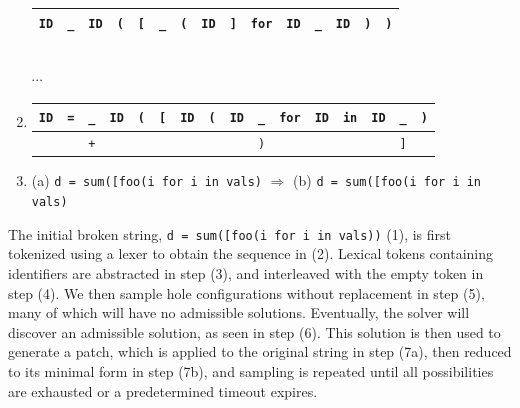 \documentclass[sigplan,review,anonymous,acmsmall]{acmart}\settopmatter{printfolios=false,printccs=false,printacmref=false}
\begin{document}
\begin{enumerate}
\begin{tabular}{|||c|||c|||c|||c|||c|||c|||c|||c|||c|||c|||c|||c|||c|||c|||c|||}
    \hline
    \texttt{ID} & \cellcolor{black!15}\texttt{\_} & \texttt{ID} & \texttt{(} & \texttt{[} & \cellcolor{black!15}\texttt{\_} & \texttt{(} & \texttt{ID} & \texttt{]} & \texttt{for} & \texttt{ID} & \cellcolor{black!15}\texttt{\_} & \texttt{ID} & \texttt{)} & \texttt{)} \\\hline
  \end{tabular}\\$\cdots$
  \item \begin{tabular}{|||c|||c||c|c|||c|||c|||c|||c|||c|||c|||c|||c|||c|||c|||c|||c|||}
          \hline
          \texttt{ID} & \texttt{=} & \cellcolor{black!15}\texttt{\_} & \texttt{ID} & \texttt{(} & \texttt{[} & \texttt{ID} & \texttt{(} & \texttt{ID} & \cellcolor{black!15}\texttt{\_} & \texttt{for} & \texttt{ID} & \texttt{in} & \texttt{ID} & \cellcolor{black!15}\texttt{\_} & \texttt{)} \\\hline
          & & \cellcolor{green!25}\texttt{+} & & & & & & & \cellcolor{orange!25}\texttt{)} & & & & & \cellcolor{orange!25}\texttt{]} & \\\hline
  \end{tabular}
  \item (a) \texttt{d = \hlgreen{+}sum([foo(i\hlorange{)} for i in vals\hlorange{]})} $\Longrightarrow$ (b) \texttt{d = sum([foo(i\hlorange{)} for i in vals\hlorange{]})}
\end{enumerate}

The initial broken string, \texttt{d = sum([foo(i\err{]} for i in vals))} (1), is first tokenized using a lexer to obtain the sequence in (2). Lexical tokens containing identifiers are abstracted in step (3), and interleaved with the empty token in step (4). We then sample hole configurations without replacement in step (5), many of which will have no admissible solutions. Eventually, the solver will discover an admissible solution, as seen in step (6). This solution is then used to generate a patch, which is applied to the original string in step (7a), then reduced to its minimal form in step (7b), and sampling is repeated until all possibilities are exhausted or a predetermined timeout expires.
\end{document}
